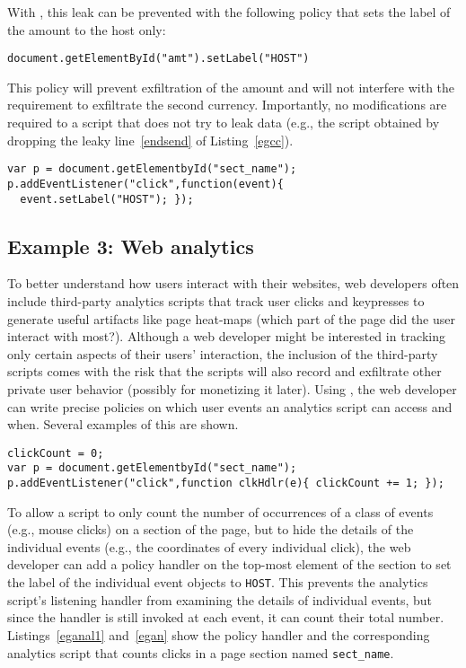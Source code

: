 With {\sys}, this leak can be prevented with the following policy that
sets the label of the amount to the host only:

\medskip
\texttt{document.getElementById("amt").setLabel("HOST")}

\medskip
\noindent This policy will prevent exfiltration of the amount and will not
interfere with the requirement to exfiltrate the second
currency. Importantly, no modifications are required to a script that
does not try to leak data (e.g., the script obtained by dropping the
leaky line~\ref{endsend} of Listing~\ref{egcc}).

\begin{lstlisting}[float,caption=Policy that allows counting clicks but hides details of the clicks,label=eganal1]
var p = document.getElementbyId("sect_name");
p.addEventListener("click",function(event){
  event.setLabel("HOST"); });
\end{lstlisting}

\subsection{Example 3: Web analytics} 
To better understand how
users interact with their websites, web developers often include
third-party analytics scripts that track user clicks and keypresses to
generate useful artifacts like page heat-maps (which part of the page
did the user interact with most?). Although a web developer might be
interested in tracking only certain aspects of their users'
interaction, the inclusion of the third-party scripts comes with the
risk that the scripts will also record and exfiltrate other private
user behavior (possibly for monetizing it later). Using {\sys}, the
web developer can write precise policies on which user events an
analytics script can access and when. Several examples of this are
shown. 

\begin{lstlisting}[float, caption=Analytics script that counts clicks,label=egan]
clickCount = 0;
var p = document.getElementbyId("sect_name");  
p.addEventListener("click",function clkHdlr(e){ clickCount += 1; });
\end{lstlisting}

To allow a script to only count the number of occurrences of a class
of events (e.g., mouse clicks) on a section of the page, but to hide
the details of the individual events (e.g., the coordinates of every
individual click), the web developer can add a policy handler on the
top-most element of the section to set the label of the individual
event objects to \texttt{HOST}. This prevents the analytics script's
listening handler from examining the details of individual events, but
since the handler is still invoked at each event, it can count their
total number. Listings~\ref{eganal1} and~\ref{egan} show the policy
handler and the corresponding analytics script that counts clicks in a
page section named \texttt{sect\_name}.

